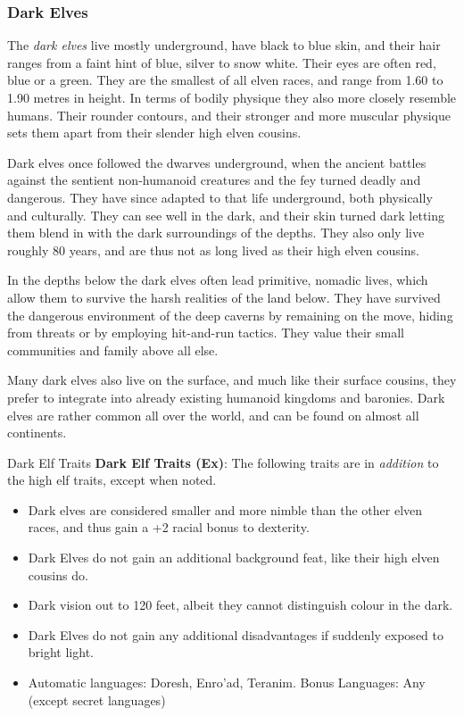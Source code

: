 \subsubsection{Dark Elves}
\label{sec:Dark Elves}

The \emph{dark elves} live mostly underground, have black to blue skin, and
their hair ranges from a faint hint of blue, silver to snow white. Their eyes
are often red, blue or a green. They are the smallest of all elven races, and
range from 1.60 to 1.90 metres in height. In terms of bodily physique they
also more closely resemble humans. Their rounder contours, and their stronger
and more muscular physique sets them apart from their slender high elven
cousins.

Dark elves once followed the dwarves underground, when the ancient battles
against the sentient non-humanoid creatures and the fey turned deadly and
dangerous. They have since adapted to that life underground, both physically
and culturally. They can see well in the dark, and their skin turned dark
letting them blend in with the dark surroundings of the depths. They also only
live roughly 80 years, and are thus not as long lived as their high elven
cousins.

In the depths below the dark elves often lead primitive, nomadic lives, which
allow them to survive the harsh realities of the land below. They have
survived the dangerous environment of the deep caverns by remaining on the
move, hiding from threats or by employing hit-and-run tactics. They value
their small communities and family above all else.

Many dark elves also live on the surface, and much like their surface cousins,
they prefer to integrate into already existing humanoid kingdoms and baronies.
Dark elves are rather common all over the world, and can be found on almost all
continents.

\begin{35e}{Dark Elf Traits}
  \textbf{Dark Elf Traits (Ex)}: The following traits are in \emph{addition}
  to the high elf traits, except when noted.
  \begin{itemize}[noitemsep]
    \item Dark elves are considered smaller and more nimble than the other
      elven races, and thus gain a +2 racial bonus to dexterity.
    \item Dark Elves do not gain an additional background feat, like their
      high elven cousins do.
    \item Dark vision out to 120 feet, albeit they cannot distinguish colour
      in the dark.
    \item Dark Elves do not gain any additional disadvantages if suddenly
      exposed to bright light.
    \item Automatic languages: Doresh, Enro'ad, Teranim. Bonus Languages: Any
      (except secret languages)
  \end{itemize}
\end{35e}

